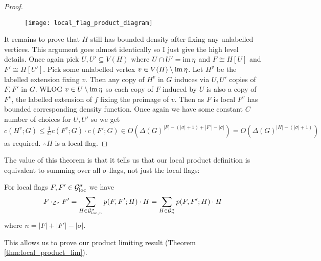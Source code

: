\begin{proof}
    \begin{figure}[!ht]
        \centering
        \texttt{[image: local\_flag\_product\_diagram]}
    \end{figure}

    It remains to prove that $H$ still has bounded density after fixing any unlabelled vertices.
    This argument goes almost identically so I just give the high level details. Once again
    pick $U, U' \subseteq V(H)$ where $U\cap U'=\operatorname{im}\eta$ and $F\cong H[U]$ and $F' \cong H[U']$.
    Pick some unlabelled vertex $v\in V(H)\setminus \operatorname{im}\eta$.
    Let $H^v$ be the labelled extension fixing $v$. Then any copy of $H^v$ in $G$ induces
    via $U, U'$ copies of $F, F'$ in $G$. WLOG $v \in U \setminus \operatorname{im} \eta$ so each copy
    of $F$ induced by $U$ is also a copy of $F^v$, the labelled extension of $f$ fixing the
    preimage of $v$. Then as $F$ is local $F^v$ has bounded corresponding density
    function. Once again we have some constant $C$ number of choices for $U, U'$ so we
    get
    $c(H^v; G) \leq \frac{1}{C} c(F^v; G) \cdot c(F'; G) \in
    O(\Delta(G)^{|F|-(|\sigma|+1)+|F'|-|\sigma|}) = O(\Delta(G)^{|H|-(|\sigma|+1)})$
    as required.  $\therefore H$ is a local flag.
\end{proof}

The value of this theorem is that it tells us that our local product definition is
equivalent to summing over all $\sigma$-flags, not just the local flags:

\begin{corollary}
    \label{corollary:local_product}
    For local flags $F, F' \in \mathcal{G}_\mathrm{loc}^\sigma$ we have
    \[
        F \cdot_{\mathcal{L}^\sigma} F'
        = \sum_{H\in\mathcal{G}_{\mathrm{loc},n}^\sigma}p(F, F'; H)\cdot H
        = \sum_{H\in\mathcal{G}_n^\sigma}p(F, F'; H)\cdot H
    \]
    where $n=|F|+|F'|-|\sigma|$.
\end{corollary}

This allows us to prove our product limiting result (Theorem \ref{thm:local_product_lim}).

